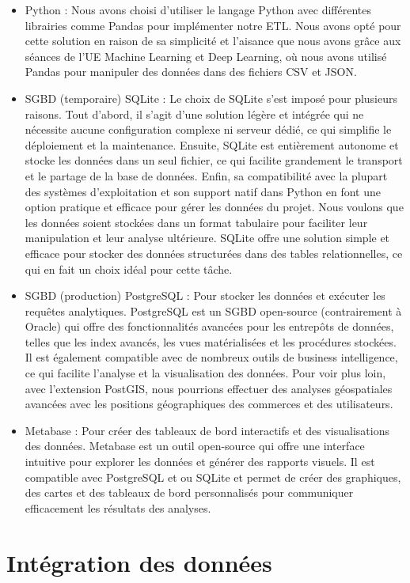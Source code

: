 \begin{itemize}
\begin{itemize}
\begin{itemize}
\item Python : Nous avons choisi d’utiliser le langage Python avec différentes librairies comme Pandas pour implémenter notre ETL. Nous avons opté pour cette solution en raison de sa simplicité et l'aisance que nous avons grâce aux séances de l'UE Machine Learning et Deep Learning, où nous avons utilisé Pandas pour manipuler des données dans des fichiers CSV et JSON\@.
\item SGBD (temporaire) SQLite : Le choix de SQLite s’est imposé pour plusieurs raisons. Tout d’abord, il s’agit d’une solution légère et intégrée qui ne nécessite aucune configuration complexe ni serveur dédié,
ce qui simplifie le déploiement et la maintenance. Ensuite, SQLite est entièrement autonome et stocke les données dans un seul fichier, ce qui facilite grandement le transport et le
partage de la base de données. Enfin, sa compatibilité avec la plupart des systèmes d’exploitation et son support natif dans Python en font une option pratique et efficace pour
gérer les données du projet. Nous voulons que les données soient stockées dans un format tabulaire pour faciliter leur manipulation et leur analyse ultérieure.
SQLite offre une solution simple et efficace pour stocker des données structurées dans des tables relationnelles, ce qui en fait un choix idéal pour cette tâche.
\item SGBD (production) PostgreSQL : Pour stocker les données et exécuter les requêtes analytiques.
PostgreSQL est un SGBD open-source (contrairement à Oracle) qui offre des fonctionnalités avancées pour les entrepôts de données, telles que les index avancés, les vues matérialisées et les procédures stockées.
Il est également compatible avec de nombreux outils de business intelligence, ce qui facilite l’analyse et la visualisation des données. Pour voir plus loin, avec l'extension PostGIS, nous pourrions effectuer des analyses géospatiales avancées avec les positions géographiques des commerces et des utilisateurs.
\item Metabase : Pour créer des tableaux de bord interactifs et des visualisations des données. Metabase est un outil open-source qui offre une interface intuitive pour explorer les données et générer des rapports visuels.
Il est compatible avec PostgreSQL et ou SQLite et permet de créer des graphiques, des cartes et des tableaux de bord personnalisés pour communiquer efficacement les résultats des analyses.
\end{itemize}


\chapter*{Intégration des données}



\end{itemize}
\end{itemize}
